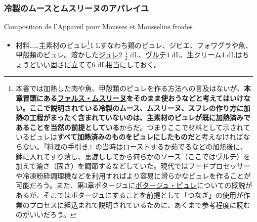 \begin{recette}

\hypertarget{composition-de-l-appareil-pour-mousses-et-mousseline-froides}{%
\subsubsection{冷製のムースとムスリーヌのアパレイユ}\label{composition-de-l-appareil-pour-mousses-et-mousseline-froides}}

\begin{frsubenv}

Composition de l'Appareil pour Mousses et Mousseline froides

\end{frsubenv}


\begin{itemize}
\tightlist
\item
  材料\ldots{}\ldots{}主素材のピュレ\footnote{本書では加熱した肉や魚、甲殻類のピュレを作る方法への言及はないが、\textbf{本章冒頭にある\protect\hyperlink{farce-mousseline}{ファルス・ムスリーヌ}をそのまま使おうなどと考えてはいけない。ここで説明されている冷製のムース、ムスリーヌ、スフレの作り方に加熱の工程がまったく含まれていないのは、主素材のピュレが既に加熱済みであることを当然の前提としている}からだ。つまりここで材料として示されているピュレは\textbf{すべて加熱済みのものをピュレにしたものだ}と考えなければならない。『料理の手引き』の当時はローストするか茹でるなどの加熱後に、鉢に入れてすり潰し、裏漉ししてから何らかのソース（ここではヴルテ）を加えて漉さ（固さ）を調節するなどしていた。現代ではフードプロセッサーや冷凍粉砕調理機などを利用すればより容易に滑らかなピュレを作ることが可能だろう。また、第3章ポタージュに\protect\hyperlink{les-purees}{ポタージュ・ピュレ}についての概説があるが、そこではポタージュにすることを前提として「つなぎ」の使用が作業のプロセスに組込まれて説明されているために、あくまで参考程度に読むのがいいだろう。}1
  Lすなわち鶏のピュレ、ジビエ、フォワグラや魚、甲殻類のピュレ。溶かした\protect\hyperlink{gelees-ordinaires}{ジュレ}2
  \(\frac{1}{2}\) dL、\protect\hyperlink{veloute}{ヴルテ}4
  dL、生クリーム4 dLはちょうどいい固さに立てて6 dL相当にしておく。
\end{itemize}


\end{recette}
